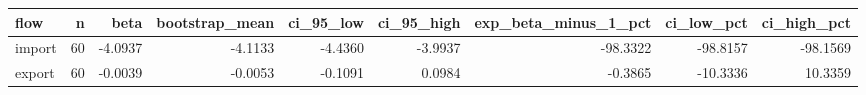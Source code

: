\begin{tabular}{lrrrrrrrr}
\toprule
flow & n & beta & bootstrap\_mean & ci\_95\_low & ci\_95\_high & exp\_beta\_minus\_1\_pct & ci\_low\_pct & ci\_high\_pct \\
\midrule
import & 60 & -4.0937 & -4.1133 & -4.4360 & -3.9937 & -98.3322 & -98.8157 & -98.1569 \\
export & 60 & -0.0039 & -0.0053 & -0.1091 & 0.0984 & -0.3865 & -10.3336 & 10.3359 \\
\bottomrule
\end{tabular}
